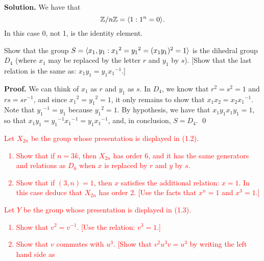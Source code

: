 \begin{enumerate}
      \textbf{Solution.} We have that
      $$\mathbb{Z}/n\mathbb{Z} = \langle 1 : 1^n = 0 \rangle.$$
      In this case 0, not 1, is the identity element.
   \item[1.2.16]  Show that the group $S =
                  \langle x_1, y_1 : {x_1}^2 = {y_1}^2 = (x_1y_1)^2 = 1 \rangle$ is the
                  dihedral group $D_4$ (where $x_1$ may be replaced by the
                  letter $r$ and $y_1$ by $s$). [Show that the last relation is
                  the same as: $x_1y_1 = y_1{x_1}^{-1}$.]

      \textbf{Proof.} We can think of $x_1$ as $r$ and $y_1$ as $s$. In $D_4$,
      we know that $r^2 = s^2 = 1$ and $rs = sr^{-1}$, and since
      ${x_1}^2 = {y_1}^2 = 1$, it only remains to show that
      $x_1x_2 = x_2{x_1}^{-1}$. Note that ${y_1}^{-1} = y_1$ because
      ${y_1}^2 = 1$. By hypothesis, we have that $x_1y_1x_1y_1 = 1$,
      so that $x_1y_1 = {y_1}^{-1}{x_1}^{-1} = y_1{x_1}^{-1}$, and, in 
      conclusion, $S = D_4$. \qed
   \textcolor{red}{\item[1.2.17]  Let $X_{2n}$ be the group whose presentation is displayed in
                  (1.2).
                  \begin{enumerate}
                     \item Show that if $n = 3k$, then $X_{2n}$ has order 6, and
                           it has the same generators and relations as $D_6$
                           when $x$ is replaced by $r$ and $y$ by $s$.
                     \item Show that if $(3, n) = 1$, then $x$ satisfies the
                           additional relation: $x = 1$. In this case deduce
                           that $X_{2n}$ has order 2. [Use the facts that
                           $x^n = 1$ and $x^3 = 1$.]
                  \end{enumerate}
   \item[1.2.18]  Let $Y$ be the group whose presentation is displayed in (1.3).
                  \begin{enumerate}
                     \item Show that $v^2 = v^{-1}$.
                           [Use the relation: $v^3 = 1$.]
                     \item Show that $v$ commutes with $u^3$. [Show that
                           $v^2u^3v = u^3$ by writing the left hand side as

\end{enumerate}}
\end{enumerate}
